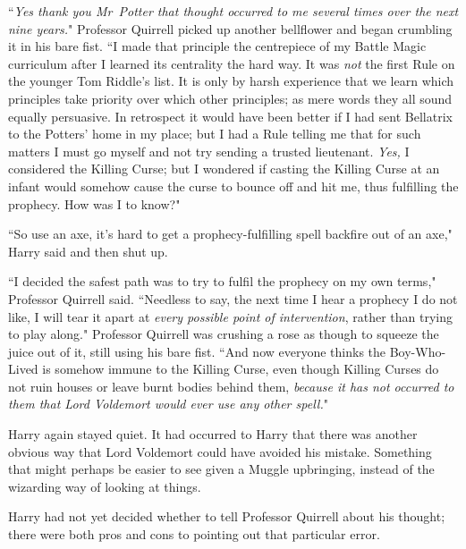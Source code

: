 ``\emph{Yes thank you Mr~Potter that thought occurred to me several times over the next nine years.}" Professor Quirrell picked up another bellflower and began crumbling it in his bare fist. ``I made that principle the centrepiece of my Battle Magic curriculum after I learned its centrality the hard way. It was \emph{not} the first Rule on the younger Tom Riddle's list. It is only by harsh experience that we learn which principles take priority over which other principles; as mere words they all sound equally persuasive. In retrospect it would have been better if I had sent Bellatrix to the Potters' home in my place; but I had a Rule telling me that for such matters I must go myself and not try sending a trusted lieutenant. \emph{Yes,} I considered the Killing Curse; but I wondered if casting the Killing Curse at an infant would somehow cause the curse to bounce off and hit me, thus fulfilling the prophecy. How was I to know?"

``So use an axe, it's hard to get a prophecy-fulfilling spell backfire out of an axe," Harry said and then shut up.

``I decided the safest path was to try to fulfil the prophecy on my own terms," Professor Quirrell said. ``Needless to say, the next time I hear a prophecy I do not like, I will tear it apart at \emph{every possible point of intervention}, rather than trying to play along." Professor Quirrell was crushing a rose as though to squeeze the juice out of it, still using his bare fist. ``And now everyone thinks the Boy-Who-Lived is somehow immune to the Killing Curse, even though Killing Curses do not ruin houses or leave burnt bodies behind them, \emph{because it has not occurred to them that Lord Voldemort would ever use any other spell.}"

Harry again stayed quiet. It had occurred to Harry that there was another obvious way that Lord Voldemort could have avoided his mistake. Something that might perhaps be easier to see given a Muggle upbringing, instead of the wizarding way of looking at things.

Harry had not yet decided whether to tell Professor Quirrell about his thought; there were both pros and cons to pointing out that particular error.

